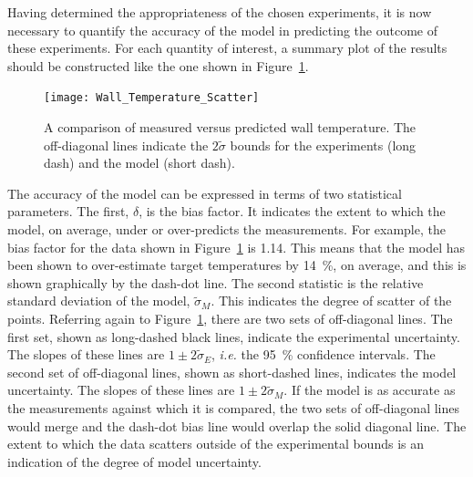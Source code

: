 \documentclass[graybox]{svmult}
\begin{document}
Having determined the appropriateness of the chosen experiments, it is now necessary to quantify the accuracy of the model in predicting the outcome of these experiments. For each quantity of interest, a summary plot of the results should be constructed like the one shown in Figure~\ref{scatterplot}. 
\begin{figure}[ht]
\texttt{[image: Wall\_Temperature\_Scatter]} 
\caption{A comparison of measured versus predicted wall temperature. The off-diagonal lines indicate the $2 \widetilde{\sigma}$ bounds for the experiments (long dash) and the model (short dash).}
\label{scatterplot}
\end{figure}
The accuracy of the model can be expressed in terms of two statistical parameters. The first, $\delta$, is the bias factor. It indicates the extent to which the model, on average, under or over-predicts the measurements. For example, the bias factor for the data shown in Figure~\ref{scatterplot} is 1.14. This means that the model has been shown to over-estimate target temperatures by 14~\%, on average, and this is shown graphically by the dash-dot line. The second statistic is the relative standard deviation of the model, $\widetilde{\sigma}_M$. This indicates the degree of scatter of the points. Referring again to Figure~\ref{scatterplot}, there are two sets of off-diagonal lines. The first set, shown as long-dashed black lines, indicate the experimental uncertainty. The slopes of these lines are $1\pm 2 \widetilde{\sigma}_E$, {\em i.e.} the 95~\% confidence intervals. The second set of off-diagonal lines, shown as short-dashed lines, indicates the model uncertainty. The slopes of these lines are $1\pm 2 \widetilde{\sigma}_M$. If the model is as accurate as the measurements against which it is compared, the two sets of off-diagonal lines would merge and the dash-dot bias line would overlap the solid diagonal line. The extent to which the data scatters outside of the experimental bounds is an indication of the degree of model uncertainty.
\end{document}
